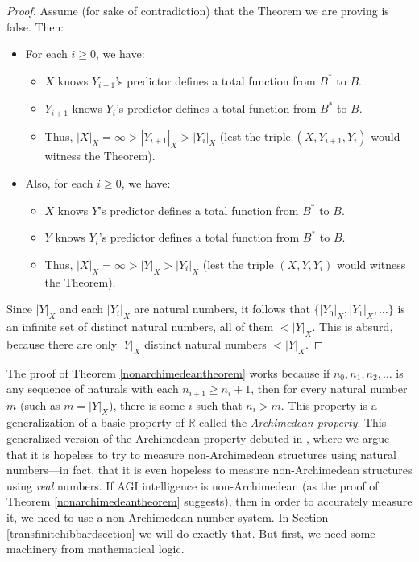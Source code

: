 \documentclass{article}
\begin{document}
\begin{proof}
    Assume (for sake of contradiction) that the Theorem we are proving is false.
    Then:
    \begin{itemize}
        \item
        For each $i\geq 0$, we have:
        \begin{itemize}
            \item
            $X$ knows $Y_{i+1}$'s predictor defines a total function from $B^*$ to $B$.
            \item
            $Y_{i+1}$ knows $Y_i$'s predictor defines a total function from $B^*$ to $B$.
            \item
            Thus, $|X|_X=\infty>|Y_{i+1}|_X>|Y_i|_X$ (lest the triple $(X,Y_{i+1},Y_i)$
            would witness the Theorem).
        \end{itemize}
        \item
        Also, for each $i\geq 0$, we have:
        \begin{itemize}
            \item
            $X$ knows $Y$'s predictor defines a total function from $B^*$ to $B$.
            \item
            $Y$ knows $Y_i$'s predictor defines a total function from $B^*$ to $B$.
            \item
            Thus, $|X|_X=\infty>|Y|_X>|Y_i|_X$ (lest the triple $(X,Y,Y_i)$
            would witness the Theorem).
        \end{itemize}
    \end{itemize}
    Since $|Y|_X$ and each $|Y_i|_X$ are natural numbers, it follows that
    $\{|Y_0|_X, |Y_1|_X, \ldots\}$
    is an infinite set of distinct natural numbers, all of them $<|Y|_X$.
    This is absurd, because there are only $|Y|_X$ distinct natural numbers
    $<|Y|_X$.
\end{proof}

The proof of Theorem \ref{nonarchimedeantheorem} works because if $n_0,n_1,n_2,\ldots$
is any sequence of naturals with each $n_{i+1}\geq n_i+1$, then for every natural number
$m$ (such as $m=|Y|_X$),
there is some $i$ such that $n_i>m$. This property is a generalization of a
basic property of $\mathbb R$ called the \emph{Archimedean property}. This generalized
version of the Archimedean property debuted in \cite{alexander2020archimedean},
where we argue that it is hopeless to try to measure non-Archimedean structures
using natural numbers---in fact, that it is even hopeless to measure non-Archimedean
structures using \emph{real} numbers. If AGI intelligence is non-Archimedean (as the
proof of Theorem \ref{nonarchimedeantheorem} suggests), then in order to
accurately measure it, we need to use a non-Archimedean number system.
In Section \ref{transfinitehibbardsection}
we will do exactly that. But first, we need some machinery from mathematical logic.
\end{document}

